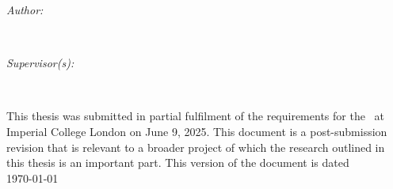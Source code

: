 \begin{titlepage}
\begin{minipage}{0.4\textwidth}
\begin{flushleft} \large
\emph{Author:}\\
\reportauthor %
\end{flushleft}
\end{minipage}
~
\begin{minipage}{0.4\textwidth}
\begin{flushright} \large
\emph{Supervisor(s):} \\
\supervisor %
\end{flushright}
\end{minipage}\\[2cm]
\makeatother

\vfill %
This thesis was submitted in partial fulfilment of the requirements for the \degreetype~at Imperial College London on June 9, 2025. This document is a post-submission revision that is relevant to a broader project of which the research outlined in this thesis is an important part. This version of the document is dated
\\[0.5cm]

\makeatletter
{\large \today}\\[2cm] %
\makeatother

\end{titlepage}